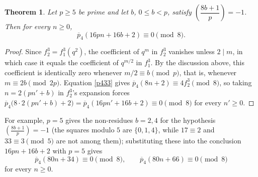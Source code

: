 \documentclass[11pt, reqno]{amsart}
\newtheorem{theorem}{Theorem}[section]
\numberwithin{equation}{section}
\begin{document}
	\begin{theorem}\label{thpdiss2}
		Let $p\ge5$ be prime and let $b$, $0\le b<p$, satisfy
		$\left(\dfrac{8b+1}{p}\right)=-1$. Then for every $n\ge0$,
		\begin{equation}
			\overline{p}_{4}(16pn+16b+2)\equiv0\pmod8.
			\label{pdiss4}
		\end{equation}
	\end{theorem}
	\begin{proof}
		Since $f_2^3=f_1^3(q^2)$, the coefficient of $q^m$ in $f_2^3$ vanishes unless
		$2\mid m$, in which case it equals the coefficient of $q^{m/2}$ in $f_1^3$. By
		the discussion above, this coefficient is identically zero whenever
		$m/2\equiv b\pmod p$, that is, whenever $m\equiv2b\pmod{2p}$. Equation
		\eqref{p433} gives $\overline{p}_4(8n+2)\equiv4f_2^3\pmod8$, so taking
		$n=2(pn'+b)$ in $f_2^3$'s expansion forces
		$\overline{p}_4\bigl(8\cdot2(pn'+b)+2\bigr)=\overline{p}_4(16pn'+16b+2)\equiv0
		\pmod8$ for every $n'\ge0$.
	\end{proof}
	For example, $p=5$ gives the non-residues $b=2,4$ for the hypothesis
	$\left(\frac{8b+1}{p}\right)=-1$ (the squares modulo $5$ are $\{0,1,4\}$,
	while $17\equiv2$ and $33\equiv3\pmod5$ are not among them); substituting
	these into the conclusion $16pn+16b+2$ with $p=5$ gives
	\[
	\overline{p}_4(80n+34)\equiv0\pmod8,\qquad
	\overline{p}_4(80n+66)\equiv0\pmod8
	\]
	for every $n\ge0$.
	
\end{document}
